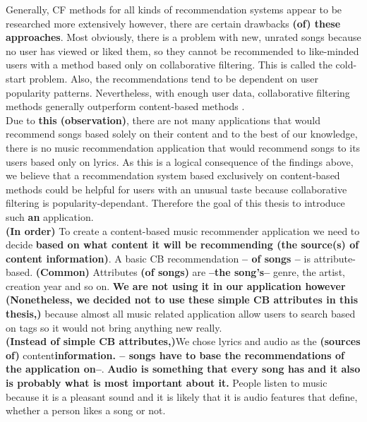 Generally, CF methods for all kinds of recommendation systems appear to be researched more extensively \cite{DBLP:journals/corr/abs-1712-07525} however, there are certain drawbacks {\bf (of) these approaches}. Most obviously, there is a problem with new, unrated songs because no user has viewed or liked them, so they cannot be recommended to like-minded users with a method based only on collaborative filtering. This is called the cold-start problem. Also, the recommendations tend to be dependent on user popularity patterns. Nevertheless, with enough user data, collaborative filtering methods generally outperform content-based methods \cite{van2013deep}. \\
Due to {\bf this (observation)}, there are not many applications that would recommend songs based solely on their content and to the best of our knowledge, there is no music recommendation application that would recommend songs to its users based only on lyrics. As this is a logical consequence of the findings above, we believe that a recommendation system based exclusively on content-based methods could be helpful for users with an unusual taste because collaborative filtering is popularity-dependant. Therefore the goal of this thesis to introduce such {\bf an} application. \\
{\bf(In order)} To create a content-based music recommender application we need to decide {\bf based on what content it will be recommending (the source(s) of content information)}. A basic CB recommendation {\bf -- of songs -- } is attribute-based. {\bf (Common)} Attributes {\bf (of songs)} are {\bf --the song's--}  genre, the artist, creation year and so on. {\bf We are not using it in our application however (Nonetheless, we decided not to use these simple CB attributes in this thesis,)} because almost all music related application allow users to search based on tags so it would not bring anything new really. \\
{\bf (Instead of simple CB attributes,)}We chose lyrics and audio as the {\bf (sources of)} content{\bf information. -- songs have to base the recommendations of the application on--}. {\bf Audio is something that every song has and it also is probably what is most important about it.}  People listen to music because it is a pleasant sound and it is likely that it is audio features that define, whether a person likes a song or not. \\
